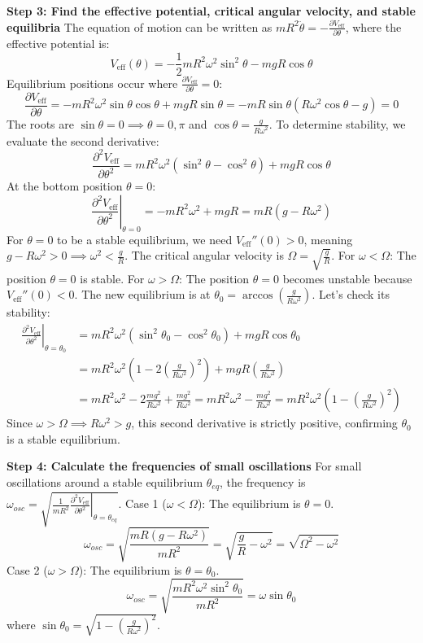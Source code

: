 \begin{solution}
\textbf{Step 3: Find the effective potential, critical angular velocity, and stable equilibria}
The equation of motion can be written as $m R^2 \ddot{\theta} = -\frac{\partial V_{\text{eff}}}{\partial \theta}$, where the effective potential is:
\[ V_{\text{eff}}(\theta) = - \frac{1}{2}m R^2 \omega^2 \sin^2\theta - mgR \cos\theta \]
Equilibrium positions occur where $\frac{\partial V_{\text{eff}}}{\partial \theta} = 0$:
\[ \frac{\partial V_{\text{eff}}}{\partial \theta} = -m R^2 \omega^2 \sin\theta \cos\theta + mgR \sin\theta = -mR \sin\theta \left( R\omega^2 \cos\theta - g \right) = 0 \]
The roots are $\sin\theta = 0 \implies \theta = 0, \pi$ and $\cos\theta = \frac{g}{R\omega^2}$.
To determine stability, we evaluate the second derivative:
\[ \frac{\partial^2 V_{\text{eff}}}{\partial \theta^2} = m R^2 \omega^2 (\sin^2\theta - \cos^2\theta) + mgR \cos\theta \]
At the bottom position $\theta = 0$:
\[ \left. \frac{\partial^2 V_{\text{eff}}}{\partial \theta^2} \right|_{\theta=0} = -m R^2 \omega^2 + mgR = mR (g - R\omega^2) \]
For $\theta=0$ to be a stable equilibrium, we need $V_{\text{eff}}''(0) > 0$, meaning $g - R\omega^2 > 0 \implies \omega^2 < \frac{g}{R}$.
The critical angular velocity is $\Omega = \sqrt{\frac{g}{R}}$.
For $\omega < \Omega$: The position $\theta = 0$ is stable.
For $\omega > \Omega$: The position $\theta = 0$ becomes unstable because $V_{\text{eff}}''(0) < 0$. The new equilibrium is at $\theta_0 = \arccos\left(\frac{g}{R\omega^2}\right)$. Let's check its stability:
\[ \begin{aligned}
    \left. \frac{\partial^2 V_{\text{eff}}}{\partial \theta^2} \right|_{\theta=\theta_0} &= m R^2 \omega^2 (\sin^2\theta_0 - \cos^2\theta_0) + mgR \cos\theta_0 \\
    &= m R^2 \omega^2 \left( 1 - 2\left(\frac{g}{R\omega^2}\right)^2 \right) + mgR \left( \frac{g}{R\omega^2} \right) \\
    &= m R^2 \omega^2 - 2 \frac{mg^2}{R\omega^2} + \frac{mg^2}{R\omega^2} = m R^2 \omega^2 - \frac{mg^2}{R\omega^2} = m R^2 \omega^2 \left( 1 - \left(\frac{g}{R\omega^2}\right)^2 \right)
\end{aligned} \]
Since $\omega > \Omega \implies R\omega^2 > g$, this second derivative is strictly positive, confirming $\theta_0$ is a stable equilibrium.

\textbf{Step 4: Calculate the frequencies of small oscillations}
For small oscillations around a stable equilibrium $\theta_{eq}$, the frequency is $\omega_{osc} = \sqrt{ \frac{1}{mR^2} \left. \frac{\partial^2 V_{\text{eff}}}{\partial \theta^2} \right|_{\theta=\theta_{eq}} }$.
Case 1 ($\omega < \Omega$): The equilibrium is $\theta = 0$.
\[ \omega_{osc} = \sqrt{\frac{mR(g - R\omega^2)}{mR^2}} = \sqrt{\frac{g}{R} - \omega^2} = \sqrt{\Omega^2 - \omega^2} \]
Case 2 ($\omega > \Omega$): The equilibrium is $\theta = \theta_0$.
\[ \omega_{osc} = \sqrt{\frac{m R^2 \omega^2 \sin^2\theta_0}{mR^2}} = \omega \sin\theta_0 \]
where $\sin\theta_0 = \sqrt{1 - \left(\frac{g}{R\omega^2}\right)^2}$.
\end{solution}

